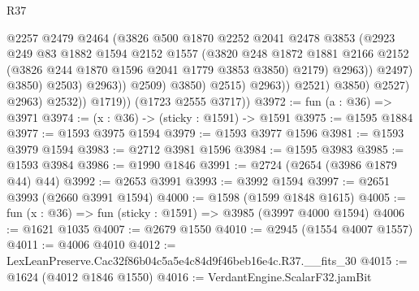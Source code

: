 \begin{lexlean}{R37}
\begin{coremodule}
                                          @2257
                                          @2479
                                          @2464
                                          (@3826
                                            @500
                                            @1870
                                            @2252
                                            @2041
                                            @2478
                                            @3853
                                            (@2923
                                              @249
                                              @83
                                              @1882
                                              @1594
                                              @2152
                                              @1557
                                              (@3820
                                                @248
                                                @1872
                                                @1881
                                                @2166
                                                @2152
                                                (@3826 @244 @1870 @1596 @2041 @1779 @3853 @3850)
                                                @2179)
                                              @2963))
                                          @2497)
                                        @3850)
                                      @2503)
                                    @2963))
                                @2509)
                              @3850)
                            @2515)
                          @2963))
                      @2521)
                    @3850)
                  @2527)
                @2963)
              @2532))
          @1719))
      (@1723 @2555 @3717))
@3972 := fun (a : @36) => @3971
@3974 := (x : @36) -> (sticky : @1591) -> @1591
@3975 := @1595 @1884
@3977 := @1593 @3975 @1594
@3979 := @1593 @3977 @1596
@3981 := @1593 @3979 @1594
@3983 := @2712 @3981 @1596
@3984 := @1595 @3983
@3985 := @1593 @3984
@3986 := @1990 @1846
@3991 := @2724 (@2654 (@3986 @1879 @44) @44)
@3992 := @2653 @3991
@3993 := @3992 @1594
@3997 := @2651 @3993 (@2660 @3991 @1594)
@4000 := @1598 (@1599 @1848 @1615)
@4005 := fun (x : @36) => fun (sticky : @1591) => @3985 (@3997 @4000 @1594)
@4006 := @1621 @1035
@4007 := @2679 @1550
@4010 := @2945 (@1554 @4007 @1557)
@4011 := @4006 @4010
@4012 := LexLeanPreserve.Cac32f86b04c5a5e4c84d9f46beb16e4c.R37.__fits_30
@4015 := @1624 (@4012 @1846 @1550)
@4016 := VerdantEngine.ScalarF32.jamBit

\end{coremodule}
\end{lexlean}
